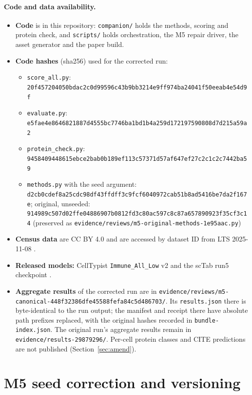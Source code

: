 \documentclass[11pt]{article}
\begin{document}
\paragraph{Code and data availability.}
\begin{itemize}
\item \textbf{Code} is in this repository: \texttt{companion/} holds the methods, scoring and protein check, and \texttt{scripts/} holds orchestration, the M5 repair driver, the asset generator and the paper build.
\item \textbf{Code hashes} (sha256) used for the corrected run:
\begin{itemize}
\item \nolinkurl{score_all.py}: \nolinkurl{20f457204050bdac2c0d99596c43b9bb3214e9ff974ba24041f50eeab4e54d9f}
\item \texttt{evaluate.py}: \nolinkurl{e5fae4e8646821887d4555bc7746ba1bd1b4a259d172197590808d7d215a59a2}
\item \nolinkurl{protein_check.py}: \nolinkurl{9458409448615ebce2bab0b189ef113c57371d57af647ef27c2c1c2c7442ba59}
\item \texttt{methods.py} with the seed argument: \nolinkurl{d2cb0cdef8a25cdc98df43ffdff3c9fcf6040972cab51b8ad5416be7da2f167e}; original, unseeded: \nolinkurl{914989c507d02ffe04886907b0812fd3c80ac597c8c87a657890923f35cf3c14} (preserved as \nolinkurl{evidence/reviews/m5-original-methods-1e95aac.py})
\end{itemize}
\item \textbf{Census data} are CC BY 4.0 and are accessed by dataset ID from LTS 2025-11-08 \citep{czi2025cellxgene,censusreleases}.
\item \textbf{Released models:} CellTypist \nolinkurl{Immune_All_Low} v2 \citep{celltypistmodels} and the scTab run5 checkpoint \citep{sctabrepo}.
\item \textbf{Aggregate results} of the corrected run are in \nolinkurl{evidence/reviews/m5-canonical-448f32386dfe45588fefa84c5d486703/}. Its \nolinkurl{results.json} there is byte-identical to the run output; the manifest and receipt there have absolute path prefixes replaced, with the original hashes recorded in \nolinkurl{bundle-index.json}. The original run's aggregate results remain in \nolinkurl{evidence/results-29879296/}. Per-cell protein classes and CITE predictions are not published (Section~\ref{sec:amend}).
\end{itemize}

\section{M5 seed correction and versioning}\label{sec:m5}
\end{document}

